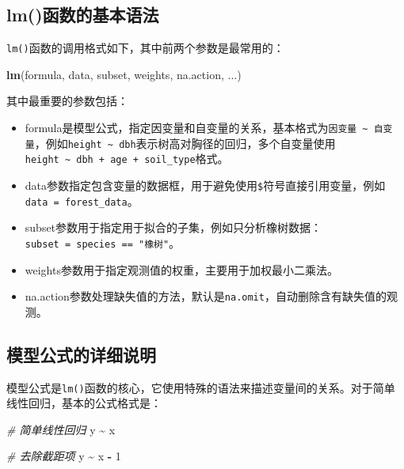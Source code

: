 \documentclass[
  twoside,12pt,fontset=none]{ctexbook}
\newenvironment{Shaded}{\begin{snugshade}}{\end{snugshade}}
\newcommand{\CommentTok}[1]{\textcolor[rgb]{0.56,0.35,0.01}{\textit{#1}}}
\newcommand{\DecValTok}[1]{\textcolor[rgb]{0.00,0.00,0.81}{#1}}
\newcommand{\FunctionTok}[1]{\textcolor[rgb]{0.13,0.29,0.53}{\textbf{#1}}}
\newcommand{\NormalTok}[1]{#1}
\newcommand{\SpecialCharTok}[1]{\textcolor[rgb]{0.81,0.36,0.00}{\textbf{#1}}}
\providecommand{\tightlist}{%
  \setlength{\itemsep}{0pt}\setlength{\parskip}{0pt}}
\begin{document}
\hypertarget{lmux51fdux6570ux7684ux57faux672cux8bedux6cd5}{%
\subsection{lm()函数的基本语法}\label{lmux51fdux6570ux7684ux57faux672cux8bedux6cd5}}

\texttt{lm()}函数的调用格式如下，其中前两个参数是最常用的：

\begin{Shaded}
\begin{Highlighting}[]
\FunctionTok{lm}\NormalTok{(formula, data, subset, weights, na.action, ...)}
\end{Highlighting}
\end{Shaded}

其中最重要的参数包括：

\begin{itemize}
\tightlist
\item
  formula是模型公式，指定因变量和自变量的关系，基本格式为\texttt{因变量\ \textasciitilde{}\ 自变量}，例如\texttt{height\ \textasciitilde{}\ dbh}表示树高对胸径的回归，多个自变量使用\texttt{height\ \textasciitilde{}\ dbh\ +\ age\ +\ soil\_type}格式。
\item
  data参数指定包含变量的数据框，用于避免使用\texttt{\$}符号直接引用变量，例如\texttt{data\ =\ forest\_data}。
\item
  subset参数用于指定用于拟合的子集，例如只分析橡树数据：\texttt{subset\ =\ species\ ==\ "橡树"}。
\item
  weights参数用于指定观测值的权重，主要用于加权最小二乘法。
\item
  na.action参数处理缺失值的方法，默认是\texttt{na.omit}，自动删除含有缺失值的观测。
\end{itemize}

\hypertarget{ux6a21ux578bux516cux5f0fux7684ux8be6ux7ec6ux8bf4ux660e}{%
\subsection{模型公式的详细说明}\label{ux6a21ux578bux516cux5f0fux7684ux8be6ux7ec6ux8bf4ux660e}}

模型公式是\texttt{lm()}函数的核心，它使用特殊的语法来描述变量间的关系。对于简单线性回归，基本的公式格式是：

\begin{Shaded}
\begin{Highlighting}[]
\CommentTok{\# 简单线性回归}
\NormalTok{y }\SpecialCharTok{\textasciitilde{}}\NormalTok{ x}

\CommentTok{\# 去除截距项}
\NormalTok{y }\SpecialCharTok{\textasciitilde{}}\NormalTok{ x }\SpecialCharTok{{-}} \DecValTok{1}
\end{Highlighting}
\end{Shaded}
\end{document}
